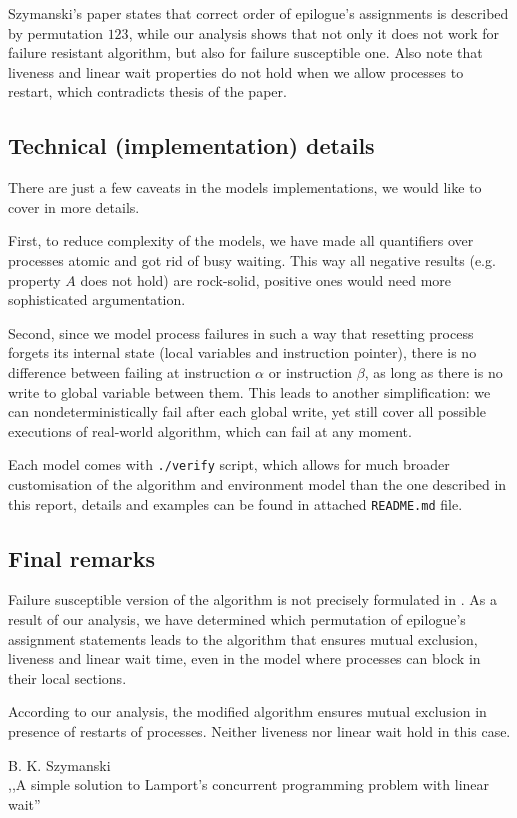 Szymanski's paper \cite{Original} states that correct order of epilogue's assignments is described by permutation $123$, while our analysis shows that not only it does not work for failure resistant algorithm, but also for failure susceptible one.
Also note that liveness and linear wait properties do not hold when we allow processes to restart, which contradicts thesis of the paper.

\subsection*{Technical (implementation) details}

There are just a few caveats in the models implementations, we would like to cover in more details.

First, to reduce complexity of the models, we have made all quantifiers over processes atomic and got rid of busy waiting.
This way all negative results (e.g. property $A$ does not hold) are rock-solid, positive ones would need more sophisticated argumentation.

Second, since we model process failures in such a way that resetting process forgets its internal state (local variables and instruction pointer), there is no difference between failing at instruction $\alpha$ or instruction $\beta$, as long as there is no write to global variable between them.
This leads to another simplification: we can nondeterministically fail after each global write, yet still cover all possible executions of real-world algorithm, which can fail at any moment.

Each model comes with \verb+./verify+ script, which allows for much broader customisation of the algorithm and environment model than the one described in this report, details and examples can be found in attached \verb+README.md+ file.

\subsection*{Final remarks}

Failure susceptible version of the algorithm is not precisely formulated in \cite{Original}.
As a result of our analysis, we have determined which permutation of epilogue's assignment statements leads to the algorithm that ensures mutual exclusion, liveness and linear wait time, even in the model where processes can block in their local sections.

According to our analysis, the modified algorithm ensures mutual exclusion in presence of restarts of processes.
Neither liveness nor linear wait hold in this case.


\begin{thebibliography}{9}
   B. K. Szymanski \\
    \newblock ,,A simple solution to Lamport's concurrent programming problem with linear wait''
\end{thebibliography}


